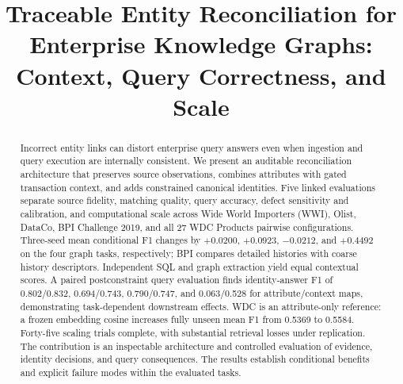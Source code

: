 \documentclass[conference,letterpaper]{IEEEtran}
\begin{document}
\title{Traceable Entity Reconciliation for\\Enterprise Knowledge Graphs:\\Context, Query Correctness, and Scale}
\author{
}
\maketitle

\begin{abstract}
Incorrect entity links can distort enterprise query answers even when ingestion and query execution are internally consistent. We present an auditable reconciliation architecture that preserves source observations, combines attributes with gated transaction context, and adds constrained canonical identities. Five linked evaluations separate source fidelity, matching quality, query accuracy, defect sensitivity and calibration, and computational scale across Wide World Importers (WWI), Olist, DataCo, BPI Challenge 2019, and all 27 WDC Products pairwise configurations. Three-seed mean conditional F1 changes by $+0.0200$, $+0.0923$, $-0.0212$, and $+0.4492$ on the four graph tasks, respectively; BPI compares detailed histories with coarse history descriptors. Independent SQL and graph extraction yield equal contextual scores. A paired postconstraint query evaluation finds identity-answer F1 of 0.802/0.832, 0.694/0.743, 0.790/0.747, and 0.063/0.528 for attribute/context maps, demonstrating task-dependent downstream effects. WDC is an attribute-only reference: a frozen embedding cosine increases fully unseen mean F1 from 0.5369 to 0.5584. Forty-five scaling trials complete, with substantial retrieval losses under replication. The contribution is an inspectable architecture and controlled evaluation of evidence, identity decisions, and query consequences. The results establish conditional benefits and explicit failure modes within the evaluated tasks.
\end{abstract}
\end{document}

